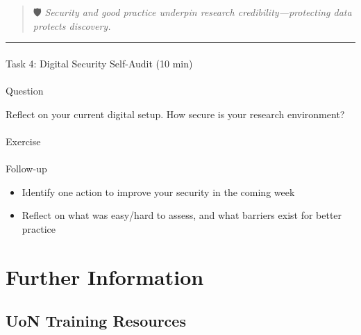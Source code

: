 \documentclass[
  letterpaper,
  DIV=11,
  numbers=noendperiod]{scrartcl}
\makeatletter
\let\oldparagraph\paragraph
\renewcommand{\paragraph}{
    \@ifstar
      \xxxParagraphStar
      \xxxParagraphNoStar
  }
\newcommand{\xxxParagraphStar}[1]{\oldparagraph*{#1}\mbox{}}
\newcommand{\xxxParagraphNoStar}[1]{\oldparagraph{#1}\mbox{}}
\providecommand{\tightlist}{%
  \setlength{\itemsep}{0pt}\setlength{\parskip}{0pt}}
\makeatother
\begin{document}
\begin{quote}
🛡️ \emph{Security and good practice underpin research
credibility---protecting data protects discovery.}
\end{quote}

\begin{center}\rule{0.5\linewidth}{0.5pt}\end{center}

\paragraph{Task 4: Digital Security Self-Audit (10
min)}\label{task-4-digital-security-self-audit-10-min}

\paragraph{Question}

Reflect on your current digital setup. How secure is your research
environment?

\paragraph{Exercise}

\label{frame-q4}

\paragraph{Follow-up}

\begin{itemize}
\tightlist
\item
  Identify one action to improve your security in the coming week\\
\item
  Reflect on what was easy/hard to assess, and what barriers exist for
  better practice\\
\end{itemize}

\section{Further Information}\label{further-information}

\subsection{UoN Training Resources}\label{uon-training-resources}
\end{document}
